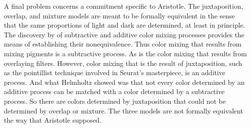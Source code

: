 A final problem concerns a commitment specific to Aristotle. The juxtaposition, overlap, and mixture models are meant to be formally equivalent in the sense that the same proportions of light and dark are determined, at least in principle. The discovery by \citet{Helmholtz:1852aa} of subtractive and additive color mixing processes provides the means of establishing their nonequivalence. Thus color mixing that results from mixing pigments is a subtractive process. As is the color mixing that results from overlaying filters. However, color mixing that is the result of juxtaposition, such as the pointillist technique involved in Seurat's masterpiece, is an additive process. And what Helmholtz showed was that not every color determined by an additive process can be matched with a color determined by a subtractive process. So there are colors determined by juxtaposition that could not be determined by overlap or mixture. The three models are not formally equivalent the way that Aristotle supposed.

